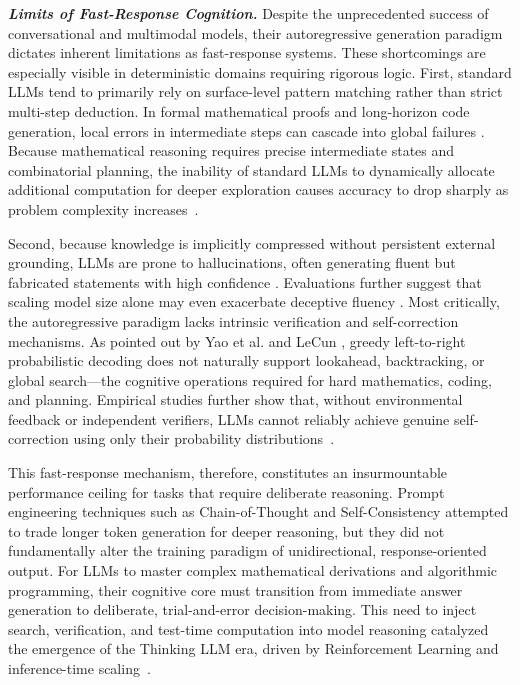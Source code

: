 \textbf{\textit{Limits of Fast-Response Cognition.}} Despite the unprecedented success of conversational and multimodal models, their autoregressive generation paradigm dictates inherent limitations as fast-response systems. These shortcomings are especially visible in deterministic domains requiring rigorous logic. First, standard LLMs tend to primarily rely on surface-level pattern matching rather than strict multi-step deduction. In formal mathematical proofs and long-horizon code generation, local errors in intermediate steps can cascade into global failures \cite{chen2021evaluating,hendrycks2021math}. Because mathematical reasoning requires precise intermediate states and combinatorial planning, the inability of standard LLMs to dynamically allocate additional computation for deeper exploration causes accuracy to drop sharply as problem complexity increases~\citep{zeng2026priordrive,zheng2025survey,ying2024internlm,zhang2025process,setlur2025rewarding,yang2025beyond,dong2024cost}.

Second, because knowledge is implicitly compressed without persistent external grounding, LLMs are prone to hallucinations, often generating fluent but fabricated statements with high confidence \cite{ji2023hallucination,zhang2025siren}. Evaluations further suggest that scaling model size alone may even exacerbate deceptive fluency \cite{lin2022truthfulqa}. Most critically, the autoregressive paradigm lacks intrinsic verification and self-correction mechanisms. As pointed out by Yao et al. \cite{yao2023tree} and LeCun \cite{lecun2022path}, greedy left-to-right probabilistic decoding does not naturally support lookahead, backtracking, or global search---the cognitive operations required for hard mathematics, coding, and planning. Empirical studies \cite{cobbe2021gsm8k,huang2024large} further show that, without environmental feedback or independent verifiers, LLMs cannot reliably achieve genuine self-correction using only their probability distributions~\citep{pronesti2026beyond,xiong2025self,zhu2025retrieval,sun2025efficient,ospanov2025hermes}.

This fast-response mechanism, therefore, constitutes an insurmountable performance ceiling for tasks that require deliberate reasoning. Prompt engineering techniques such as Chain-of-Thought \cite{wei2022chain} and Self-Consistency \cite{wang2022self} attempted to trade longer token generation for deeper reasoning, but they did not fundamentally alter the training paradigm of unidirectional, response-oriented output. For LLMs to master complex mathematical derivations and algorithmic programming, their cognitive core must transition from immediate answer generation to deliberate, trial-and-error decision-making. This need to inject search, verification, and test-time computation into model reasoning catalyzed the emergence of the Thinking LLM era, driven by Reinforcement Learning and inference-time scaling~\citep{yu2025gcot,besta2025demystifying,chowdhury2025zero,joshi2025review,li2025automatic,wu2025hunyuanvideo15technicalreport}.

